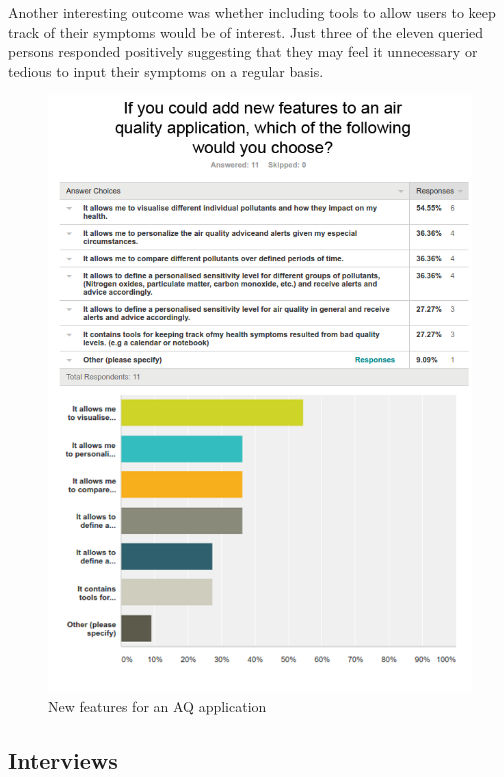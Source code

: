 Another interesting outcome was whether including tools to allow users to keep track of their symptoms would be of interest. Just three of the eleven queried persons responded positively suggesting that they may feel it unnecessary or tedious to input their symptoms on a regular basis.


\begin{figure}[H]
\begin{adjustbox}{width=1\textwidth,center=\textwidth}
  \centering
  \includegraphics[scale=1]{images/new_features.png}
\end{adjustbox}
  \caption[New features for an AQ application]{New features for an AQ application}
  \label{fig:survey_new_features}
\end{figure}

\subsection{Interviews}
 
